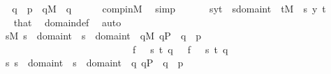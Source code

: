 \begin{isabellebody}
%
\isadelimproof
%
\endisadelimproof
%
\isatagproof
{}\isamarkupfalse%
\ {\isacharminus}{\kern0pt}\isanewline
\ \ \isamarkupfalse%
\ {\isachardoublequoteopen}q\ {\isasympreceq}\ p\ {\isasymLongrightarrow}\ q{\isasymin}M{\isachardoublequoteclose}\ \ q\isanewline
\ \ \ \ \isamarkupfalse%
\ comp{\isacharunderscore}{\kern0pt}in{\isacharunderscore}{\kern0pt}M\ \isamarkupfalse%
\ simp\isanewline
\ \ \isamarkupfalse%
\isanewline
\ \ \isamarkupfalse%
\ {\isachardoublequoteopen}{\isasymlangle}s{\isacharcomma}{\kern0pt}y{\isasymrangle}{\isasymin}t\ {\isasymLongrightarrow}\ s{\isasymin}domain{\isacharparenleft}{\kern0pt}t{\isacharparenright}{\kern0pt}{\isachardoublequoteclose}\ \ {\isachardoublequoteopen}t{\isasymin}M{\isachardoublequoteclose}\ \ s\ y\ t\isanewline
\ \ \ \ \isamarkupfalse%
\ that\ \isamarkupfalse%
\ domain{\isacharunderscore}{\kern0pt}def\ \isamarkupfalse%
\ auto\isanewline
\ \ \isamarkupfalse%
\isanewline
\ \ \isamarkupfalse%
\isanewline
\ \ \ \ {\isachardoublequoteopen}{\isacharparenleft}{\kern0pt}{\isasymforall}s{\isasymin}M{\isachardot}{\kern0pt}\ s\ {\isasymin}\ domain{\isacharparenleft}{\kern0pt}t{}{\isacharparenright}{\kern0pt}\ {\isasymor}\ s\ {\isasymin}\ domain{\isacharparenleft}{\kern0pt}t{}{\isacharparenright}{\kern0pt}\ {\isasymlongrightarrow}\ {\isacharparenleft}{\kern0pt}{\isasymforall}q{\isasymin}M{\isachardot}{\kern0pt}\ q{\isasymin}P\ {\isasymand}\ q\ {\isasympreceq}\ p\ {\isasymlongrightarrow}\isanewline
\ \ \ \ \ \ \ \ \ \ \ \ \ \ \ \ \ \ \ \ \ \ \ \ \ \ \ \ \ \ {\isacharparenleft}{\kern0pt}f\ {\isacharbackquote}{\kern0pt}\ {\isasymlangle}{}{\isacharcomma}{\kern0pt}\ s{\isacharcomma}{\kern0pt}\ t{}{\isacharcomma}{\kern0pt}\ q{\isasymrangle}\ {\isacharequal}{\kern0pt}{}\ {\isasymlongleftrightarrow}\ f\ {\isacharbackquote}{\kern0pt}\ {\isasymlangle}{}{\isacharcomma}{\kern0pt}\ s{\isacharcomma}{\kern0pt}\ t{}{\isacharcomma}{\kern0pt}\ q{\isasymrangle}{\isacharequal}{\kern0pt}{}{\isacharparenright}{\kern0pt}{\isacharparenright}{\kern0pt}{\isacharparenright}{\kern0pt}\ {\isasymlongleftrightarrow}\isanewline
\ \ \ \ {\isacharparenleft}{\kern0pt}{\isasymforall}s{\isachardot}{\kern0pt}\ s\ {\isasymin}\ domain{\isacharparenleft}{\kern0pt}t{}{\isacharparenright}{\kern0pt}\ {\isasymor}\ s\ {\isasymin}\ domain{\isacharparenleft}{\kern0pt}t{}{\isacharparenright}{\kern0pt}\ {\isasymlongrightarrow}\ {\isacharparenleft}{\kern0pt}{\isasymforall}q{\isachardot}{\kern0pt}\ q{\isasymin}P\ {\isasymand}\ q\ {\isasympreceq}\ p\ {\isasymlongrightarrow}\isanewline

\end{isabellebody}
